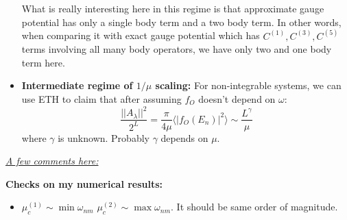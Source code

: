 \documentclass[11pt,a4paper]{article}
\begin{document}
\begin{itemize}
What is really interesting here in this regime is that approximate gauge potential has only a single body term and a two body term. In other words, when comparing it with exact gauge potential which has $C^{(1)},C^{(3)}, C^{(5)} $ terms involving all many body operators, we have only two and one body term here.

\item \textbf{Intermediate regime of $1/\mu$ scaling:} For non-integrable systems, we can use ETH to claim that after assuming $f_O$ doesn't depend on $\omega$:
\begin{equation}
\dfrac{||A_{\lambda}||^2}{2^L}= \dfrac{\pi }{4 \mu} \langle |f_O(E_n)|^2  \rangle \sim \dfrac{L^\gamma }{ \mu} 
\end{equation}
where $\gamma$ is unknown. Probably $\gamma$  depends on $\mu$.
\end{itemize}

\underline{\textit{A few comments here:}}

%
 \textbf{Checks on my numerical results:}
\begin{itemize}
\item $\mu_c^{(1)} \sim \min{\omega_{nm}}$ $\mu_c^{(2)} \sim \max{\omega_{nm}}$. It should be same order of magnitude.
\end{itemize}
\end{document}
